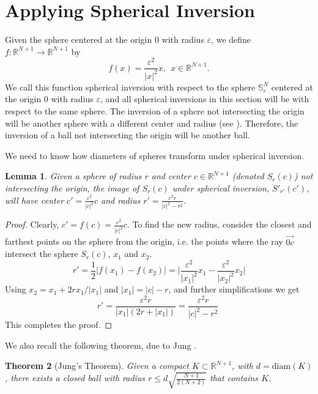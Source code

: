 \documentclass{amsart}
\numberwithin{equation}{section}
\newtheorem{theorem}{Theorem}[section]
\newtheorem{lemma}[theorem]{Lemma}
\theoremstyle{definition}
\theoremstyle{remark}
\newcommand{\R}{\mathbb{R}}
\begin{document}
\section{Applying Spherical Inversion}

Given the sphere centered at the origin $0$ with radius $\varepsilon$, we define {$f: \mathbb{R}^{N+1} \to \mathbb{R}^{N+1}$ by
\[ f(x) = \frac{\varepsilon^2}{|x|^2}x, \  \  x\in \R^{N+1}.\]}
We call this function spherical inversion with respect to the sphere {$\mathbb{S}_{\varepsilon}^{N}$} centered at the origin $0$ with radius $\varepsilon$, and all spherical inversions in this section will be with respect to the same sphere.
The inversion of a sphere not intersecting the origin will be another sphere with a different center and radius 
(see \cite[Section 6.9]{Coxeter}). Therefore, the inversion of a ball not intersecting the origin will be another ball.

We need to know how diameters of spheres transform under spherical inversion.
\begin{lemma} Given a sphere of radius $r$ and center {$c \in \mathbb{R}^{N+1}$} (denoted $S_r(c)$) not intersecting the origin, the image of $S_r(c)$ under spherical inversion, $S'_{r'}(c')$, will have center $c' = \frac{\varepsilon^2}{|c|^2}c$ and radius $r' = \frac{\varepsilon^2 r}{|c|^2 - r^2}$.
\end{lemma}

\begin{proof} Clearly, $c' = f(c) = \frac{\varepsilon^2}{|c|^2}c$.
To find the new radius, consider the closest and farthest points on the sphere from the origin, i.e. the points where the ray $\overrightarrow{0c}$ intersect the sphere $S_r(c)$, $x_1$ and  $x_2$.\\
\[ r' = \frac{1}{2}|f(x_1) - f(x_2)| = \big| \frac{\varepsilon^2}{|x_1|^2}x_1 - \frac{\varepsilon^2}{|x_2|^2}x_2  \big| \]
Using $x_2 = x_1 + 2rx_1/|x_1|$ {and $|x_1|=|c|-r$}, and further simplifications we get
\[ r' = \frac{\varepsilon^2 r}{|x_1|(2r+|x_1|)} = \frac{\varepsilon^2 r}{|c|^2 - r^2} \;  \]
{This completes the proof}. 
\end{proof}

We also  recall the following  theorem, due to Jung \cite{Jung}.

\begin{theorem}[Jung's Theorem] \textit{Given a compact {$K \subset \mathbb{R}^{N+1}$, with $d = \text{diam}(K)$}, there exists a closed ball with radius 
{$r \leq d \sqrt{\frac{N+1}{2(N+2)}}$} that contains $K$}.
\end{theorem}
\end{document}
